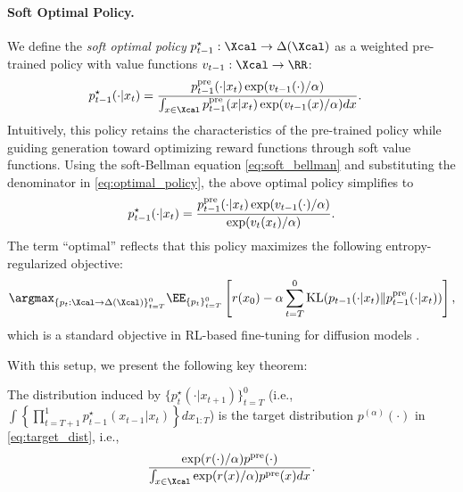 \paragraph{Soft Optimal Policy.} We define the \emph{soft optimal policy}  $p^{\star}_{t-1}:\Xcal  \to \Delta(\Xcal)$ as a weighted pre-trained policy with value functions $v_{t-1}:\Xcal \to \RR$: 
\begin{align}\label{eq:optimal_policy}
p^{\star}_{t-1}(\cdot|x_{t})&=\frac{p^{\pre}_{t-1}(\cdot |x_{t})\exp(v_{t-1}(\cdot)/\alpha)}{\int_{x\in \Xcal} p^{\pre}_{t-1}(x|x_{t})\exp(v_{t-1}(x)/\alpha)dx }. 
\end{align}
Intuitively, this policy retains the characteristics of the pre-trained policy while guiding generation toward optimizing reward functions through soft value functions. Using the soft-Bellman equation \eqref{eq:soft_bellman} and  substituting  the denominator in \eqref{eq:optimal_policy}, the above optimal policy simplifies to 
\begin{align*}
     p^{\star}_{t-1}(\cdot|x_{t})=\frac{p^{\mathrm{pre}}_{t-1}(\cdot |x_{t})\exp(v_{t-1}(\cdot)/\alpha)}{\exp(v_{t}(x_t)/\alpha) }.  
\end{align*}
The term ``optimal'' reflects that this policy maximizes the following entropy-regularized objective: 
\begin{align*}
   \argmax_{\{p_t:\Xcal \to \Delta(\Xcal) \}_{t=T}^0 } \EE_{ \{p_t\}_{t=T}^0  } \left[r(x_0)- \alpha \sum_{t=T}^0 \KL(p_{t-1}(\cdot|x_t) \| p^{\pre}_{t-1}(\cdot|x_t))   \right], 
\end{align*}
which is a standard objective in RL-based fine-tuning for diffusion models \citep{fan2023dpok,uehara2024understanding}. 



With this setup, we present the following key theorem:

\begin{Thmbox}{}
\begin{theorem}\label{thm:key}
The distribution induced by $\{ p^{\star}_t(\cdot|x_{t+1})\}_{t=T}^0$ (i.e., $\int \left\{ \prod_{t=T+1}^1 p^{\star}_{t-1}(x_{t-1}|x_t)\right \}d x_{1:T}$) is the target distribution $p^{(\alpha)}(\cdot)$ in \eqref{eq:target_dist}, i.e., 
\begin{align*} 
\frac{\exp(r(\cdot )/\alpha)p^{\pre}(\cdot)}{\int_{x\in \Xcal} \exp(r(x)/\alpha)p^{\pre}(x)dx}. 
\end{align*}
\end{theorem}
\end{Thmbox}

